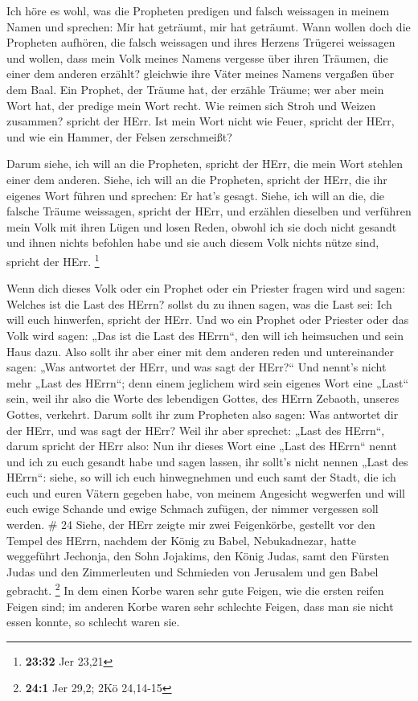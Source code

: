  Ich höre es wohl, was die Propheten predigen und falsch
weissagen in meinem Namen und sprechen: Mir hat geträumt, mir hat
geträumt.  Wann wollen doch die Propheten aufhören, die
falsch weissagen und ihres Herzens Trügerei weissagen  und
wollen, dass mein Volk meines Namens vergesse über ihren Träumen, die
einer dem anderen erzählt? gleichwie ihre Väter meines Namens vergaßen
über dem Baal.  Ein Prophet, der Träume hat, der erzähle
Träume; wer aber mein Wort hat, der predige mein Wort recht. Wie reimen
sich Stroh und Weizen zusammen? spricht der HErr.  Ist mein
Wort nicht wie Feuer, spricht der HErr, und wie ein Hammer, der Felsen
zerschmeißt?

 Darum siehe, ich will an die Propheten, spricht der HErr,
die mein Wort stehlen einer dem anderen.  Siehe, ich will
an die Propheten, spricht der HErr, die ihr eigenes Wort führen und
sprechen: Er hat's gesagt.  Siehe, ich will an die, die
falsche Träume weissagen, spricht der HErr, und erzählen dieselben und
verführen mein Volk mit ihren Lügen und losen Reden, obwohl ich sie doch
nicht gesandt und ihnen nichts befohlen habe und sie auch diesem Volk
nichts nütze sind, spricht der HErr. \footnote{\textbf{23:32} Jer 23,21}

 Wenn dich dieses Volk oder ein Prophet oder ein Priester
fragen wird und sagen: Welches ist die Last des HErrn? sollst du zu
ihnen sagen, was die Last sei: Ich will euch hinwerfen, spricht der
HErr.  Und wo ein Prophet oder Priester oder das Volk wird
sagen: „Das ist die Last des HErrn``, den will ich heimsuchen und sein
Haus dazu.  Also sollt ihr aber einer mit dem anderen reden
und untereinander sagen: „Was antwortet der HErr, und was sagt der
HErr?{}``  Und nennt's nicht mehr „Last des HErrn``; denn
einem jeglichem wird sein eigenes Wort eine „Last`` sein, weil ihr also
die Worte des lebendigen Gottes, des HErrn Zebaoth, unseres Gottes,
verkehrt.  Darum sollt ihr zum Propheten also sagen: Was
antwortet dir der HErr, und was sagt der HErr?  Weil ihr
aber sprechet: „Last des HErrn``, darum spricht der HErr also: Nun ihr
dieses Wort eine „Last des HErrn`` nennt und ich zu euch gesandt habe
und sagen lassen, ihr sollt's nicht nennen „Last des HErrn``:
 siehe, so will ich euch hinwegnehmen und euch samt der
Stadt, die ich euch und euren Vätern gegeben habe, von meinem Angesicht
wegwerfen  und will euch ewige Schande und ewige Schmach
zufügen, der nimmer vergessen soll werden. \# 24  Siehe, der
HErr zeigte mir zwei Feigenkörbe, gestellt vor den Tempel des HErrn,
nachdem der König zu Babel, Nebukadnezar, hatte weggeführt Jechonja, den
Sohn Jojakims, den König Judas, samt den Fürsten Judas und den
Zimmerleuten und Schmieden von Jerusalem und gen Babel gebracht.
\footnote{\textbf{24:1} Jer 29,2; 2Kö 24,14-15}  In dem
einen Korbe waren sehr gute Feigen, wie die ersten reifen Feigen sind;
im anderen Korbe waren sehr schlechte Feigen, dass man sie nicht essen
konnte, so schlecht waren sie.

